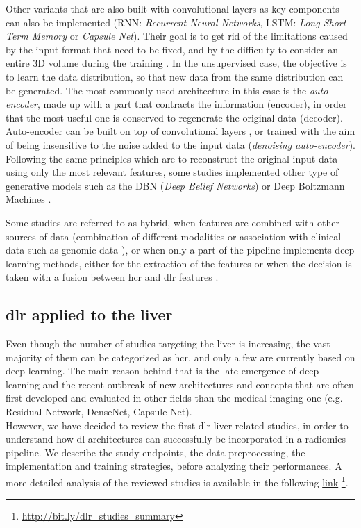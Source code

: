 Other variants that are also built with convolutional layers as key
components can also be implemented (RNN: \emph{Recurrent Neural Networks}, LSTM: \emph{Long Short Term Memory} or
\emph{Capsule Net}). Their goal is to get rid of the limitations caused
by the input format that need to be fixed, and by the difficulty to
consider an entire 3D volume during the training \cite{Azizi2018}.
In the unsupervised case, the objective is to learn the data distribution,
so that new data from the same distribution can be generated. 
The most commonly used architecture
in this case is the \emph{auto-encoder}, made up with a part that
contracts the information (encoder), in order that the most useful one
is conserved to regenerate the original data (decoder). Auto-encoder can
be built on top of convolutional layers \cite{Echaniz2017}, 
or trained with the aim of being insensitive to the noise
added to the input data (\emph{denoising auto-encoder})\cite{Sun2017a,Kim2016}. 
Following the same principles which are to reconstruct the
original input data using only the most relevant features, some studies
implemented other type of generative models such as the 
DBN (\emph{Deep Belief Networks}) \cite{Sun2017a} or Deep Boltzmann Machines \cite{Suk2014}.

Some studies are referred to as hybrid, when features are combined with
other sources of data (combination of different modalities 
\cite{Oikonomou2018} or association with clinical
data such as genomic data \cite{Emaminejad2016}), or
when only a part of the pipeline implements deep learning methods,
either for the extraction of the features \cite{Paul2016} or when the decision is taken with a fusion between \ac{hcr}
and \ac{dlr} features \cite{Huynh2016}.

\subsection{\ac{dlr} applied to the liver}\label{dlr-applied-to-the-liver}

Even though the number of studies targeting the liver is increasing, the
vast majority of them can be categorized as \ac{hcr}, and only a few
are currently based on deep learning.
The main reason behind that is the late emergence of deep learning and
the recent outbreak of new architectures and concepts that are often
first developed and evaluated in other fields than the medical imaging
one (e.g. Residual Network, DenseNet, Capsule Net).\\
However, we have decided to review the first \ac{dlr}-liver related studies, in order to understand how \ac{dl} architectures can successfully be incorporated in a radiomics pipeline. We describe the study endpoints, the data preprocessing, the implementation and training strategies, before analyzing their performances. A more detailed analysis of the reviewed studies is available in the following \href{http://bit.ly/dlr_studies_summary}{link} \footnote{\url{http://bit.ly/dlr_studies_summary}}.

